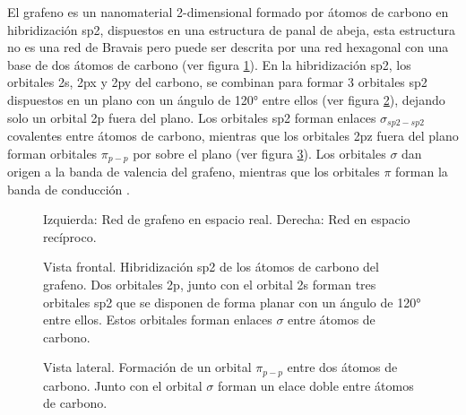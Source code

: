 
El grafeno es un nanomaterial 2-dimensional formado por átomos de carbono en hibridización sp2, dispuestos en una estructura de panal de abeja, esta estructura no es una red de Bravais pero puede ser descrita por una red hexagonal con una base de dos átomos de carbono (ver figura \ref{fig_graphene_lattice}). En la hibridización sp2, los orbitales 2s, 2px y 2py del carbono, se combinan para formar 3 orbitales sp2 dispuestos en un plano con un ángulo de 120° entre ellos (ver figura \ref{fig:sp2_hybrid}), dejando solo un orbital 2p fuera del plano. Los orbitales sp2 forman enlaces $\sigma_{sp2-sp2}$ covalentes entre átomos de carbono, mientras que los orbitales 2pz fuera del plano forman orbitales $\pi_{p-p}$ por sobre el plano (ver figura \ref{fig:pi_orbitals}). Los orbitales $\sigma$ dan origen a la banda de valencia del grafeno, mientras que los orbitales $\pi$ forman la banda de conducción \citep{CastroNeto2009}.

\begin{figure}
	\centering
	\caption[Estructura del grafeno]{Izquierda: Red de grafeno en espacio real. Derecha: Red en espacio recíproco.}
	\label{fig_graphene_lattice}
\end{figure}

\begin{figure}
	\centering
	\caption[Hibridización sp2]{Vista frontal. Hibridización sp2 de los átomos de carbono del grafeno. Dos orbitales 2p, junto con el orbital 2s forman tres orbitales sp2 que se disponen de forma planar con un ángulo de 120° entre ellos. Estos orbitales forman enlaces $\sigma$ entre átomos de carbono.}
	\label{fig:sp2_hybrid}
\end{figure}

\begin{figure}
	\centering
	\caption[Formación de un orbital $\pi$]{Vista lateral. Formación de un orbital $\pi_{p-p}$ entre dos átomos de carbono. Junto con el orbital $\sigma$ forman un elace doble entre átomos de carbono.}
	\label{fig:pi_orbitals}
\end{figure}

